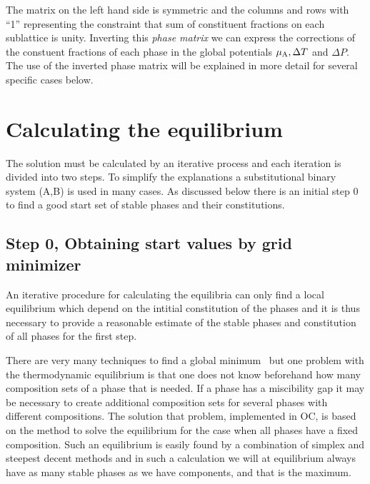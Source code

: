 \documentclass[12pt]{article}
\begin{document}
The matrix on the left hand side is symmetric and the columns and rows
with ``1'' representing the constraint that sum of constituent
fractions on each sublattice is unity.  Inverting this {\em phase
  matrix} we can express the corrections of the constuent fractions of
each phase in the global potentials $\mu_{\rm A}, \Delta T$ and
$\Delta P$.  The use of the inverted phase matrix will be explained in
more detail for several specific cases below.

\section{Calculating the equilibrium}

The solution must be calculated by an iterative process and each
iteration is divided into two steps.  To simplify the explanations a
substitutional binary system (A,B) is used in many cases.  As
discussed below there is an initial step 0 to find a good start set of
stable phases and their constitutions.

\subsection{Step 0, Obtaining start values by grid minimizer}

An iterative procedure for calculating the equilibria can only find a
local equilibrium which depend on the intitial constitution of the
phases and it is thus necessary to provide a reasonable estimate of
the stable phases and constitution of all phases for the first step.

There are very many techniques to find a global minimum~\cite{09Flo}
but one problem with the thermodynamic equilibrium is that one does
not know beforehand how many composition sets of a phase that is
needed.  If a phase has a miscibility gap it may be necessary to
create additional composition sets for several phases with different
compositions.  The solution that problem, implemented in OC, is based
on the method to solve the equilibrium for the case when all phases
have a fixed composition.  Such an equilibrium is easily found by a
combination of simplex and steepest decent methods and in such a
calculation we will at equilibrium always have as many stable phases
as we have components, and that is the maximum.
\end{document}

